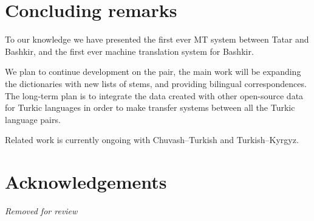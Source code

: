 \documentclass[11pt,a4paper]{article}
\begin{document}
\cite{TyersAlperen2010}

\section{Concluding remarks}
\label{sec:conc}

To our knowledge we have presented the first ever MT system between
Tatar and Bashkir, and the first ever machine translation system
for Bashkir.

We plan to continue development on the pair, the main work will be 
expanding the dictionaries with new lists of stems, and providing 
bilingual correspondences. The long-term plan is to integrate the 
data created with other open-source data for Turkic languages in order
to make transfer systems between all the Turkic language pairs. 

Related work is currently ongoing with Chuvash--Turkish 
and Turkish--Kyrgyz.


\section*{Acknowledgements}

{\em Removed for review}



\end{document}
